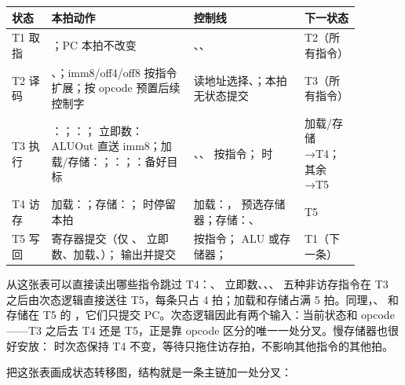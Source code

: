 \begin{longtable}{L{0.1\linewidth}L{0.36\linewidth}L{0.28\linewidth}L{0.14\linewidth}}
\toprule
状态 & 本拍动作 & 控制线 & 下一状态 \\
\midrule
T1 取指 & ；PC 本拍不改变 & 、、 & T2（所有指令） \\\tablerowrule
T2 译码 & 、；imm8/off4/off8 按指令扩展；按 opcode 预置后续控制字 & 读地址选择、；本拍无状态提交 & T3（所有指令） \\\tablerowrule
T3 执行 & ：；：； 立即数：ALUOut 直送 imm8；加载/存储：；：；：备好目标 & 、、 按指令； 时  & 加载/存储→T4；其余→T5 \\\tablerowrule
T4 访存 & 加载：；存储：； 时停留本拍 & 加载：， 预选存储器；存储：、 & T5 \\\tablerowrule
T5 写回 & 寄存器提交（仅 、 立即数、加载、）； 输出并提交 &  按指令； ALU 或存储器； & T1（下一条） \\
\bottomrule
\end{longtable}

从这张表可以直接读出哪些指令跳过 T4：、 立即数、、、 五种非访存指令在 T3 之后由次态逻辑直接送往 T5，每条只占 4 拍；加载和存储占满 5 拍。同理，、 和存储在 T5 的 ，它们只提交 PC。次态逻辑因此有两个输入：当前状态和 opcode——T3 之后去 T4 还是 T5，正是靠 opcode 区分的唯一一处分叉。慢存储器也很好安放： 时次态保持 T4 不变，等待只拖住访存拍，不影响其他指令的其他拍。

把这张表画成状态转移图，结构就是一条主链加一处分叉：

